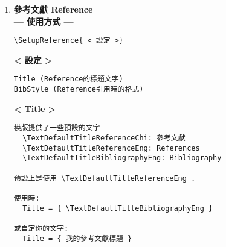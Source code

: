 \begin{enumerate}
{\newpage
    目錄中章節號碼跟章節題目中的分隔符號\\
    正常在目錄中會顯示 'Chapter 1. ABCDEF' 或 '第一章. ABCDEF'\\
    但因個人喜好, 做法不一樣,\\
    如 'Chapter 1: ABCDEF' 或 '第一章 ABCDEF'\\
    故使用 SepAtIndex 可設定你想要的符號或不需要符號
    \begin{DescriptionFrame}
    \begin{verbatim}
如想換'章'的由'Chapter 1. ABCDEF'換成'Chapter 1: ABCDEF'
則使用
  \SetNumberingFormat[Chapter]{%
    SepAtIndex = {:},%
   }%

如想換'章'的由'第一章. ABCDEF'換成'第一章 ABCDEF'
  \SetNumberingFormat[Chapter]{%
    BeginText = {第}, EndText = {章},%
    CNumStyle = {ChiNum},%
    SepAtIndex = {},%
  }%
    \end{verbatim}
    \end{DescriptionFrame}
  } %

  \newpage
  \item
  {
    \textbf{參考文獻 Reference}\\

    \textbf{--- 使用方式 ---}
    \begin{DescriptionFrame}
    \begin{verbatim}
\SetupReference{ < 設定 >}
    \end{verbatim}
    \end{DescriptionFrame}

    \textbf{< 設定 >}
    \begin{DescriptionFrame}
    \begin{verbatim}
Title (Reference的標題文字)
BibStyle (Reference引用時的格式)
    \end{verbatim}
    \end{DescriptionFrame}

    \textbf{< Title >}
    \begin{DescriptionFrame}
    \begin{verbatim}
模版提供了一些預設的文字
  \TextDefaultTitleReferenceChi: 參考文獻
  \TextDefaultTitleReferenceEng: References
  \TextDefaultTitleBibliographyEng: Bibliography

預設上是使用 \TextDefaultTitleReferenceEng .

使用時:
  Title = { \TextDefaultTitleBibliographyEng }

或自定你的文字:
  Title = { 我的參考文獻標題 }
    \end{verbatim}
    \end{DescriptionFrame}

}
\end{enumerate}
